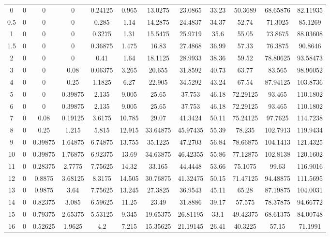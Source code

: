 \documentclass[12pt,a4paper,twoside]{report}
\begin{document}
\begin{table}[H]
{\begin{tabular}{c|ccccccccccc}
0    & 0 & 0 & 0 & 0.24125 & 0.965 & 13.0275 & 23.0865 & 33.23 & 50.3689 & 68.65876 & 82.11935 \\
0.5  & 0 & 0 & 0 & 0.285 & 1.14 & 14.2875 & 24.4837 & 34.37 & 52.74 & 71.3025 & 85.1269 \\
1    & 0 & 0 & 0 & 0.3275 & 1.31 & 15.5475 & 25.9719 & 35.6 & 55.05 & 73.8675 & 88.03608 \\
1.5  & 0 & 0 & 0 & 0.36875 & 1.475 & 16.83 & 27.4868 & 36.99 & 57.33 & 76.3875 & 90.8646 \\
2    & 0 & 0 & 0 & 0.41 & 1.64 & 18.1125 & 28.9933 & 38.36 & 59.52 & 78.80625 & 93.58473 \\
3    & 0 & 0 & 0.08 & 0.06375 & 3.265 & 20.655 & 31.8592 & 40.73 & 63.77 & 83.565 & 98.96052 \\
4    & 0 & 0 & 0.25 & 1.1825 & 6.27 & 22.905 & 34.5292 & 43.24 & 67.54 & 87.94125 & 103.8736 \\
5    & 0 & 0 & 0.39875 & 2.135 & 9.005 & 25.65 & 37.753 & 46.18 & 72.29125 & 93.465 & 110.1802 \\
6    & 0 & 0 & 0.39875 & 2.135 & 9.005 & 25.65 & 37.753 & 46.18 & 72.29125 & 93.465 & 110.1802 \\
7    & 0 & 0.08 & 0.19125 & 3.6175 & 10.785 & 29.07 & 41.3424 & 50.11 & 75.24125 & 97.7625 & 114.7238 \\
8    & 0 & 0.25 & 1.215 & 5.815 & 12.915 & 33.64875 & 45.97435 & 55.39 & 78.235 & 102.7913 & 119.9434 \\
9    & 0 & 0.39875 & 1.64875 & 6.74875 & 13.755 & 35.1225 & 47.2703 & 56.84 & 78.66875 & 104.1413 & 121.4325 \\
10   & 0 & 0.39875 & 1.76875 & 6.92375 & 13.69 & 34.63875 & 46.42355 & 55.86 & 77.12875 & 102.8138 & 120.1602 \\
11   & 0 & 0.28375 & 2.7775 & 7.75625 & 14.32 & 33.165 & 44.4448 & 53.66 & 75.1075 & 99.63 & 116.9016 \\
12   & 0 & 0.8875 & 3.68125 & 8.3175 & 14.505 & 30.76875 & 41.32475 & 50.15 & 71.47125 & 94.48875 & 111.5695 \\
13   & 0 & 0.9875 & 3.64 & 7.75625 & 13.245 & 27.3825 & 36.9543 & 45.11 & 65.28 & 87.19875 & 104.0031 \\
14   & 0 & 0.82375 & 3.085 & 6.59625 & 11.25 & 23.49 & 31.8886 & 39.17 & 57.575 & 78.37875 & 94.66772 \\
15   & 0 & 0.79375 & 2.65375 & 5.53125 & 9.345 & 19.65375 & 26.81195 & 33.1 & 49.42375 & 68.61375 & 84.00748 \\
16   & 0 & 0.52625 & 1.9625 & 4.2 & 7.215 & 15.35625 & 21.19145 & 26.41 & 40.3225 & 57.15 & 71.1991 \\

\end{tabular}}
\end{table}
\end{document}
